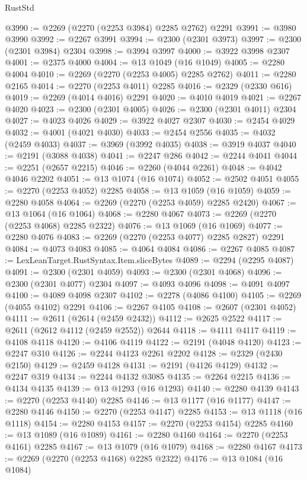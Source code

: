 \begin{lexlean}{RustStd}
\begin{coremodule}
@3990 := @2269 (@2270 (@2253 @3984) @2285 @2762) @2291
@3991 := @3980 @3990
@3992 := @2267 @3991
@3994 := @2300 (@2301 @3973)
@3997 := @2300 (@2301 @3984) @2304
@3998 := @3994 @3997
@4000 := @3922 @3998 @2307
@4001 := @2375 @4000
@4004 := @13 @1049 (@16 @1049)
@4005 := @2280 @4004
@4010 := @2269 (@2270 (@2253 @4005) @2285 @2762)
@4011 := @2280 @2165
@4014 := @2270 (@2253 @4011) @2285
@4016 := @2329 (@2330 @616)
@4019 := @2269 (@4014 @4016) @2291
@4020 := @4010 @4019
@4021 := @2267 @4020
@4023 := @2300 (@2301 @4005)
@4026 := @2300 (@2301 @4011) @2304
@4027 := @4023 @4026
@4029 := @3922 @4027 @2307
@4030 := @2454 @4029
@4032 := @4001 (@4021 @4030)
@4033 := @2454 @2556
@4035 := @4032 (@2459 @4033)
@4037 := @3969 (@3992 @4035)
@4038 := @3919 @4037
@4040 := @2191 (@3088 @4038)
@4041 := @2247 @286
@4042 := @2244 @4041
@4044 := @2251 (@2657 @2215)
@4046 := @2260 (@4044 @2261)
@4048 := @4042 @4046 @2202
@4051 := @13 @1074 (@16 @1074)
@4052 := @2502 @4051
@4055 := @2270 (@2253 @4052) @2285
@4058 := @13 @1059 (@16 @1059)
@4059 := @2280 @4058
@4064 := @2269 (@2270 (@2253 @4059) @2285 @2420)
@4067 := @13 @1064 (@16 @1064)
@4068 := @2280 @4067
@4073 := @2269 (@2270 (@2253 @4068) @2285 @2322)
@4076 := @13 @1069 (@16 @1069)
@4077 := @2280 @4076
@4083 := @2269 (@2270 (@2253 @4077) @2285 @2827) @2291
@4084 := @4073 @4083
@4085 := @4064 @4084
@4086 := @2267 @4085
@4087 := LexLeanTarget.RustSyntax.Item.sliceBytes
@4089 := @2294 (@2295 @4087)
@4091 := @2300 (@2301 @4059)
@4093 := @2300 (@2301 @4068)
@4096 := @2300 (@2301 @4077) @2304
@4097 := @4093 @4096
@4098 := @4091 @4097
@4100 := @4089 @4098 @2307
@4102 := @2278 (@4086 @4100)
@4105 := @2269 (@4055 @4102) @2291
@4106 := @2267 @4105
@4108 := @2607 (@2301 @4052)
@4111 := @2611 (@2614 (@2459 @2432))
@4112 := @2625 @2522
@4117 := @2611 (@2612 @4112 (@2459 @2552)) @2644
@4118 := @4111 @4117
@4119 := @4108 @4118
@4120 := @4106 @4119
@4122 := @2191 (@4048 @4120)
@4123 := @2247 @310
@4126 := @2244 @4123 @2261 @2202
@4128 := @2329 (@2430 @2150)
@4129 := @2459 @4128
@4131 := @2191 (@4126 @4129)
@4132 := @2247 @319
@4134 := @2244 @4132 @3085
@4135 := @2264 @2215
@4136 := @4134 @4135
@4139 := @13 @1293 (@16 @1293)
@4140 := @2280 @4139
@4143 := @2270 (@2253 @4140) @2285
@4146 := @13 @1177 (@16 @1177)
@4147 := @2280 @4146
@4150 := @2270 (@2253 @4147) @2285
@4153 := @13 @1118 (@16 @1118)
@4154 := @2280 @4153
@4157 := @2270 (@2253 @4154) @2285
@4160 := @13 @1089 (@16 @1089)
@4161 := @2280 @4160
@4164 := @2270 (@2253 @4161) @2285
@4167 := @13 @1079 (@16 @1079)
@4168 := @2280 @4167
@4173 := @2269 (@2270 (@2253 @4168) @2285 @2322)
@4176 := @13 @1084 (@16 @1084)

\end{coremodule}
\end{lexlean}
